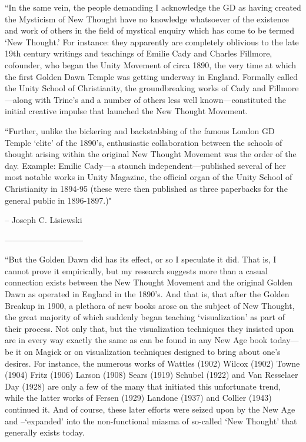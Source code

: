 \begin{footnotesize}
\begin{sffamily}
``In the same vein, the people demanding I acknowledge the GD as having created the Mysticism of New Thought have no knowledge whatsoever of the existence and work of others in the field of mystical enquiry which has come to be termed `New Thought.' For instance: they apparently are completely oblivious to the late 19th century writings and teachings of Emilie Cady and Charles Fillmore, cofounder, who began the Unity Movement of circa 1890, the very time at which the first Golden Dawn Temple was getting underway in England. Formally called the Unity School of Christianity, the groundbreaking works of Cady and Fillmore—along with Trine's and a number of others less well known—constituted the initial creative impulse that launched the New Thought Movement.

``Further, unlike the bickering and backstabbing of the famous London GD Temple `elite' of the 1890's, enthusiastic collaboration between the schools of thought arising within the original New Thought Movement was the order of the day. Example: Emilie Cady—a staunch independent—published several of her most notable works in Unity Magazine, the official organ of the Unity School of Christianity in 1894-95 (these were then published as three paperbacks for the general public in 1896-1897.)"

– Joseph C. Lisiewski

—————————–

``But the Golden Dawn did has its effect, or so I speculate it did. That is, I cannot prove it empirically, but my research suggests more than a casual connection exists between the New Thought Movement and the original Golden Dawn as operated in England in the 1890's. And that is, that after the Golden Breakup in 1900, a plethora of new books arose on the subject of New Thought, the great majority of which suddenly began teaching `visualization' as part of their process. Not only that, but the visualization techniques they insisted upon are in every way exactly the same as can be found in any New Age book today—be it on Magick or on visualization techniques designed to bring about one's desires. For instance, the numerous works of Wattles (1902) Wilcox (1902) Towne (1904) Fritz (1906) Larson (1908) Sears (1919) Schubel (1922) and Van Resselaer Day (1928) are only a few of the many that initiated this unfortunate trend, while the latter works of Fersen (1929) Landone (1937) and Collier (1943) continued it. And of course, these later efforts were seized upon by the New Age and --‘expanded' into the non-functional miasma of so-called `New Thought' that generally exists today.


\end{sffamily}
\end{footnotesize}
